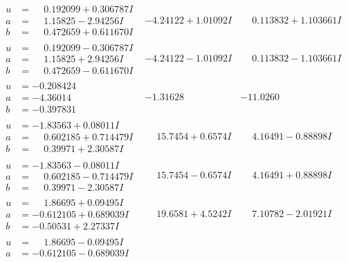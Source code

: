 \documentclass[1p]{elsarticle_modified}
\theoremstyle{definition}
\begin{document}
$$\begin{array}{c|c|c}
\begin{aligned}
u &= \phantom{-}0.192099 + 0.306787 I \\
a &= \phantom{-}1.15825 - 2.94256 I \\
b &= \phantom{-}0.472659 + 0.611670 I\end{aligned}
 & -4.24122 + 1.01092 I & \phantom{-}0.113832 + 1.103661 I \\ \hline\begin{aligned}
u &= \phantom{-}0.192099 - 0.306787 I \\
a &= \phantom{-}1.15825 + 2.94256 I \\
b &= \phantom{-}0.472659 - 0.611670 I\end{aligned}
 & -4.24122 - 1.01092 I & \phantom{-}0.113832 - 1.103661 I \\ \hline\begin{aligned}
u &= -0.208424\phantom{ +0.000000I} \\
a &= -4.36014\phantom{ +0.000000I} \\
b &= -0.397831\phantom{ +0.000000I}\end{aligned}
 & -1.31628\phantom{ +0.000000I} & -11.0260\phantom{ +0.000000I} \\ \hline\begin{aligned}
u &= -1.83563 + 0.08011 I \\
a &= \phantom{-}0.602185 + 0.714479 I \\
b &= \phantom{-}0.39971 + 2.30587 I\end{aligned}
 & \phantom{-}15.7454 + 0.6574 I & \phantom{-}4.16491 - 0.88898 I \\ \hline\begin{aligned}
u &= -1.83563 - 0.08011 I \\
a &= \phantom{-}0.602185 - 0.714479 I \\
b &= \phantom{-}0.39971 - 2.30587 I\end{aligned}
 & \phantom{-}15.7454 - 0.6574 I & \phantom{-}4.16491 + 0.88898 I \\ \hline\begin{aligned}
u &= \phantom{-}1.86695 + 0.09495 I \\
a &= -0.612105 + 0.689039 I \\
b &= -0.50531 + 2.27337 I\end{aligned}
 & \phantom{-}19.6581 + 4.5242 I & \phantom{-}7.10782 - 2.01921 I \\ \hline\begin{aligned}
u &= \phantom{-}1.86695 - 0.09495 I \\
a &= -0.612105 - 0.689039 I \\

\end{aligned}
\end{array}$$
\end{document}
